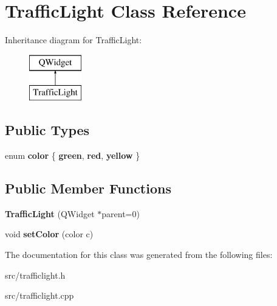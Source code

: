 \hypertarget{class_traffic_light}{}\section{Traffic\+Light Class Reference}
\label{class_traffic_light}
Inheritance diagram for Traffic\+Light\+:\begin{figure}[H]
\begin{center}
\leavevmode
\includegraphics[height=2.000000cm]{class_traffic_light}
\end{center}
\end{figure}
\subsection*{Public Types}
\begin{DoxyCompactItemize}
\item 
\hypertarget{class_traffic_light_a52ce5d9c3d0ec5aad2884db90fc10876}{}\label{class_traffic_light_a52ce5d9c3d0ec5aad2884db90fc10876} 
enum {\bfseries color} \{ {\bfseries green}, 
{\bfseries red}, 
{\bfseries yellow}
 \}
\end{DoxyCompactItemize}
\subsection*{Public Member Functions}
\begin{DoxyCompactItemize}
\item 
\hypertarget{class_traffic_light_aa018a0285c92c087e48d3b16be3088ca}{}\label{class_traffic_light_aa018a0285c92c087e48d3b16be3088ca} 
{\bfseries Traffic\+Light} (Q\+Widget $\ast$parent=0)
\item 
\hypertarget{class_traffic_light_ad1e030e87446be2c976f5aedb4f511d5}{}\label{class_traffic_light_ad1e030e87446be2c976f5aedb4f511d5} 
void {\bfseries set\+Color} (color c)
\end{DoxyCompactItemize}


The documentation for this class was generated from the following files\+:\begin{DoxyCompactItemize}
\item 
src/trafficlight.\+h\item 
src/trafficlight.\+cpp\end{DoxyCompactItemize}
